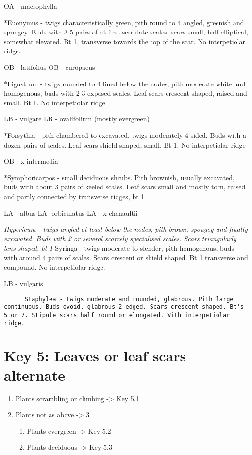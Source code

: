 \documentclass[openany]{book}
\providecommand{\tightlist}{%
  \setlength{\itemsep}{0pt}\setlength{\parskip}{0pt}}
\begin{document}
OA - macrophylla

*Euonymus - twigs characteristically green, pith round to 4 angled,
greenish and spongey. Buds with 3-5 pairs of at first serrulate scales,
scars small, half elliptical, somewhat elevated. Bt 1, transverse
towards the top of the scar. No interpetiolar ridge.

OB - latifolius OB - europaeus

*Ligustrum - twigs rounded to 4 lined below the nodes, pith moderate
white and homogenous, buds with 2-3 exposed scales. Leaf scars crescent
shaped, raised and small. Bt 1. No interpetiolar ridge

LB - vulgare LB - ovalifolium (mostly evergreen)

*Forsythia - pith chambered to excavated, twigs moderately 4 sided. Buds
with a dozen pairs of scales. Leaf scars shield shaped, small. Bt 1. No
interpetiolar ridge

OB - x intermedia

*Symphoricarpos - small deciduous shrubs. Pith brownish, usually
excavated, buds with about 3 pairs of keeled scales. Leaf scars small
and mostly torn, raised and partly connected by transverse ridges, bt 1

LA - albus LA -orbiculatus LA - x chenaultii

\emph{Hypericum - twigs angled at least below the nodes, pith brown,
spongey and finally excavated. Buds with 2 or several scarcely
specialised scales. Scars triangularly lens shaped, bt 1 }Syringa -
twigs moderate to slender, pith homogenous, buds with around 4 pairs of
scales. Scars crescent or shield shaped. Bt 1 transverse and compound.
No interpetiolar ridge.

LB - vulgaris

\begin{verbatim}
      Staphylea - twigs moderate and rounded, glabrous. Pith large, continuous. Buds ovoid, glabrous 2 edged. Scars crescent shaped. Bt's 5 or 7. Stipule scars half round or elongated. With interpetiolar ridge.
\end{verbatim}

\hypertarget{key-5-leaves-or-leaf-scars-alternate}{%
\section{Key 5: Leaves or leaf scars
alternate}\label{key-5-leaves-or-leaf-scars-alternate}}

\begin{enumerate}
\def\labelenumi{\arabic{enumi}.}
\tightlist
\item
  Plants scrambling or climbing -\textgreater{} Key 5.1
\item
  Plants not as above -\textgreater{} 3

  \begin{enumerate}
  \def\labelenumii{\arabic{enumii}.}
  \setcounter{enumii}{2}
  \tightlist
  \item
    Plants evergreen -\textgreater{} Key 5.2
  \item
    Plants deciduous -\textgreater{} Key 5.3
  \end{enumerate}
\end{enumerate}
\end{document}
